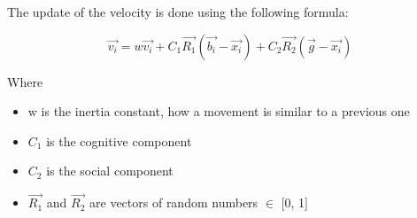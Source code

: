The update of the velocity is done using the following formula:

\[
\vec{v_i} = w\vec{v_i} + C_1 \vec{R_1}(\vec{b_i} - \vec{x_i}) + C_2 \vec{R_2}(\vec{g}- \vec{x_i})
\]

Where

\begin{itemize}
    \item w is the inertia constant, how a movement is similar to a previous one
    \item $C_1$ is the cognitive component
    \item $C_2$ is the social component
    \item $\vec{R_1}$ and $\vec{R_2}$ are vectors of random numbers $\in$ [0, 1]
\end{itemize}







